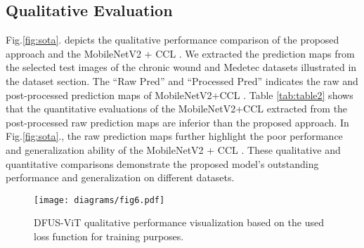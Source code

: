 \documentclass[review]{elsarticle}
\begin{document}
\subsection{Qualitative Evaluation}
Fig.\ref{fig:sota}. depicts the qualitative performance comparison of the proposed approach and the MobileNetV2 + CCL \cite{wang2020fully}. We extracted the prediction maps from the selected test images of the chronic wound and Medetec datasets \cite{thomas_2014} illustrated in the dataset section. The \enquote{Raw Pred} and \enquote{Processed Pred} indicates the raw and post-processed prediction maps of MobileNetV2+CCL \cite{wang2020fully}. Table \ref{tab:table2} shows that the quantitative evaluations of the MobileNetV2+CCL \cite{wang2020fully} extracted from the post-processed raw prediction maps are inferior than the proposed approach. In Fig.\ref{fig:sota}., the raw prediction maps further highlight the poor performance and generalization ability of the MobileNetV2 + CCL \cite{wang2020fully}. These qualitative and quantitative comparisons demonstrate the proposed model's outstanding performance and generalization on different datasets.
\begin{figure*}[h!]
	\texttt{[image: diagrams/fig6.pdf]}
	\caption{DFUS-ViT qualitative performance visualization based on the used loss function for training purposes.}
	\label{fig:losscmpdiagram}
\end{figure*}
\end{document}
